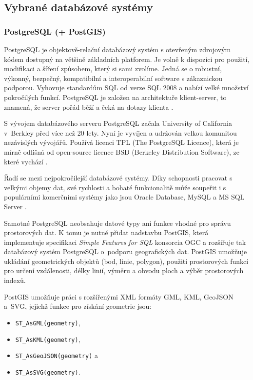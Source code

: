 \subsection{Vybrané databázové systémy}
\label{kPouziteProstredky}

\subsubsection{PostgreSQL (+ PostGIS)}
        \label{kPostgreSQL}

PostgreSQL je objektově-relační databázový systém s otevřeným zdrojovým kódem dostupný na většině základních platforem. Je volně k dispozici pro použití, modifikaci a šíření způsobem, který si sami zvolíme. Jedná se o robustní, výkonný, bezpečný, kompatibilní a interoperabilní software s zákaznickou podporou. Vyhovuje standardům SQL od verze SQL 2008 a nabízí velké množství pokročilých funkcí. PostgreSQL je založen na architektuře klient-server, to znamená, že server pořád běží a čeká na dotazy klienta \citep{Momjian2001}. 

S vývojem databázového serveru PostgreSQL začala University of California v~Berkley před více než 20 lety. Nyní je vyvíjen a udržován velkou komunitou nezávislých vývojářů. Používá licenci TPL (The PostgreSQL Licence), která je mírně odlišná od open-source licence BSD (Berkeley Distribution Software), ze které vychází \citep{RiggsKrossing2010}.

Řadí se mezi nejpokročilejší databázové systémy. Díky schopnosti pracovat s velkými objemy dat, své rychlosti a bohaté funkcionalitě může soupeřit i s populárními komerčními systémy jako jsou Oracle Database, MySQL a MS SQL Server \citep{PostgreSQL2012}.

Samotné PostgreSQL neobsahuje datové typy ani funkce vhodné pro správu prostorových dat. K tomu je nutné přidat nadstavbu PostGIS, která implementuje specifikaci {\it Simple Features for SQL} konsorcia OGC a rozšiřuje tak databázový systém PostgreSQL o~podporu geografických dat. PostGIS umožňuje ukládání geo\-me\-tric\-kých objektů (bod, linie, polygon), použití prostorových funkcí pro určení vzdálenosti, délky linií, výměru a obvodu ploch a výběr prostorových indexů.

PostGIS umožňuje práci s rozšířenými XML formáty GML, KML, GeoJSON a~SVG, jejichž funkce pro získání geometrie jsou:
\begin{itemize}
\item \texttt{ST\_AsGML(geometry)},
\item \texttt{ST\_AsKML(geometry)},
\item \texttt{ST\_AsGeoJSON(geometry)} a 
\item \texttt{ST\_AsSVG(geometry)}.
\end{itemize}

